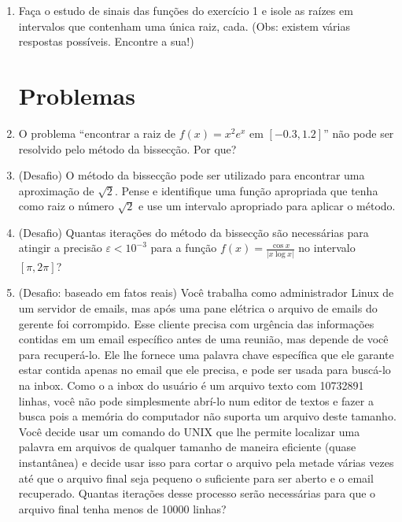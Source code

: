 \documentclass[a4paper]{article}
\begin{document}
\begin{enumerate}
\item Faça o estudo de sinais das funções do exercício 1 e isole as
  raízes em intervalos que contenham uma única raiz, cada. (Obs:
  existem várias respostas possíveis. Encontre a sua!)

\section{Problemas}


\item O problema ``encontrar a raiz de $f(x) = x^2 e^x$ em
  $[-0.3,1.2]$'' não pode ser resolvido pelo método da bissecção. Por
  que?

\item (Desafio) O método da bissecção pode ser utilizado para
  encontrar uma aproximação de $\sqrt{2}$. Pense e identifique uma
  função apropriada que tenha como raiz o número $\sqrt{2}$ e use um
  intervalo apropriado para aplicar o método.

\item (Desafio) Quantas iterações do método da bissecção são
  necessárias para atingir a precisão $\varepsilon<10^{-3}$ para a
  função $f(x)= \frac{\cos x}{| x \log x |}$ no intervalo $\left[\pi,
    2\pi \right]$?

\item (Desafio: baseado em fatos reais) Você trabalha como
  administrador Linux de um servidor de emails, mas após uma pane
  elétrica o arquivo de emails do gerente foi corrompido. Esse cliente
  precisa com urgência das informações contidas em um email específico
  antes de uma reunião, mas depende de você para recuperá-lo. Ele lhe
  fornece uma palavra chave específica que ele garante estar contida
  apenas no email que ele precisa, e pode ser usada para buscá-lo na
  inbox. Como o a inbox do usuário é um arquivo texto com 10732891
  linhas, você não pode simplesmente abrí-lo num editor de textos e
  fazer a busca pois a memória do computador não suporta um arquivo
  deste tamanho. Você decide usar um comando do UNIX que lhe permite
  localizar uma palavra em arquivos de qualquer tamanho de maneira
  eficiente (quase instantânea) e decide usar isso para cortar o
  arquivo pela metade várias vezes até que o arquivo final seja
  pequeno o suficiente para ser aberto e o email recuperado. Quantas
  iterações desse processo serão necessárias para que o arquivo final
  tenha menos de 10000 linhas?
\end{enumerate}
\end{document}

